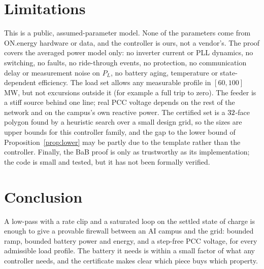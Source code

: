 \documentclass[journal]{IEEEtran}
\theoremstyle{remark}
\begin{document}
\section{Limitations}
This is a public, assumed-parameter model. None of the parameters come from ON.energy hardware or data, and the
controller is ours, not a vendor's. The proof covers the averaged power model only: no inverter current or PLL
dynamics, no switching, no faults, no ride-through events, no protection, no communication delay or measurement
noise on $P_L$, no battery aging, temperature or state-dependent efficiency. The load set allows any measurable profile
in $[60,100]$\,MW, but not excursions outside it (for example a full trip to zero). The feeder is a stiff source
behind one line; real PCC voltage depends on the rest of the network and on the campus's own reactive power.
The certified set is a $32$-face polygon found by a heuristic search over a small design grid, so the sizes are
upper bounds for this controller family, and the gap to the lower bound of Proposition~\ref{prop:lower} may be
partly due to the template rather than the controller. Finally, the BaB proof is only as trustworthy as its
implementation; the code is small and tested, but it has not been formally verified.

\section{Conclusion}
A low-pass with a rate clip and a saturated loop on the settled state of charge is enough to give a provable firewall
between an AI campus and the grid: bounded ramp, bounded battery power and energy, and a step-free PCC voltage, for
every admissible load profile. The battery it needs is within a small factor of what any controller needs, and the
certificate makes clear which piece buys which property.
\end{document}
